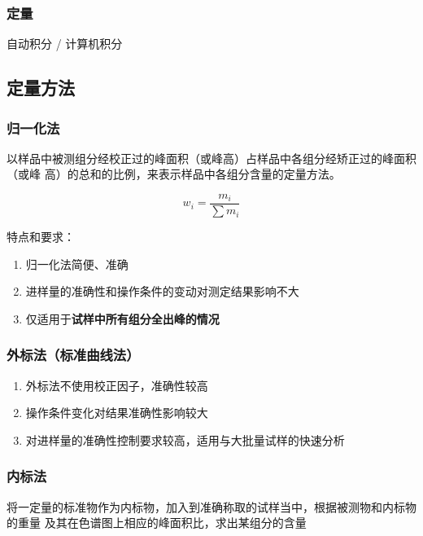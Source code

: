 \subsubsection{定量}

自动积分 / 计算机积分

\subsection{定量方法}

\subsubsection{归一化法}

以样品中被测组分经校正过的峰面积（或峰高）占样品中各组分经矫正过的峰面积（或峰
高）的总和的比例，来表示样品中各组分含量的定量方法。

\begin{equation}
    w_i = \frac{m_i}{\sum m_i}
\end{equation}

特点和要求：

\begin{enumerate}
    \item 归一化法简便、准确
    \item 进样量的准确性和操作条件的变动对测定结果影响不大
    \item 仅适用于\textbf{试样中所有组分全出峰的情况}
\end{enumerate}

\subsubsection{外标法（标准曲线法）}

\begin{enumerate}
    \item 外标法不使用校正因子，准确性较高
    \item 操作条件变化对结果准确性影响较大
    \item 对进样量的准确性控制要求较高，适用与大批量试样的快速分析
\end{enumerate}

\subsubsection{内标法}

将一定量的标准物作为内标物，加入到准确称取的试样当中，根据被测物和内标物的重量
及其在色谱图上相应的峰面积比，求出某组分的含量

